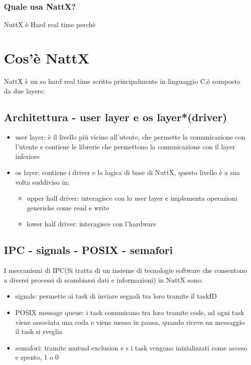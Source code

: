 \documentclass{report}
\begin{document}
\subsubsection{Quale usa NattX?}
NuttX è Hard real time perchè 
\section{Cos'è NattX}
NattX è un so hard real time scritto principalmente in linguaggio C,è composto da due layers:


\subsection{Architettura - user layer e os layer*(driver)}
\begin{itemize}
    \item user layer: è il livello più vicino all’utente, che permette la comunicazione con l’utente e contiene le librerie che permettono la comunicazione con il layer inferiore
    \item os layer: contiene i driver e la logica di base di NuttX, questo livello è a sua volta suddiviso in:
    \begin{itemize}
        \item upper half driver:  interagisce con lo user layer e  implementa operazioni generiche come read e write
        \item lower half driver: interagisce con l’hardware
    \end{itemize}
\end{itemize}


\subsection{IPC - signals - POSIX - semafori}
I meccanismi di IPC(Si tratta di un insieme di tecnologie software che consentono a diversi processi di scambiarsi dati e informazioni) in NuttX sono:
\begin{itemize}
    \item signals: permette ai task di inviare segnali tra loro tramite il taskID
    \item POSIX message queue: i task comunicano tra loro tramite code, ad ogni task viene associata una coda e viene messo in pausa, quando riceve un messaggio il task si sveglia
    \item semafori: tramite mutual exclusion e s i task vengono inizializzati come acceso e spento, 1 o 0
\end{itemize}
\end{document}
